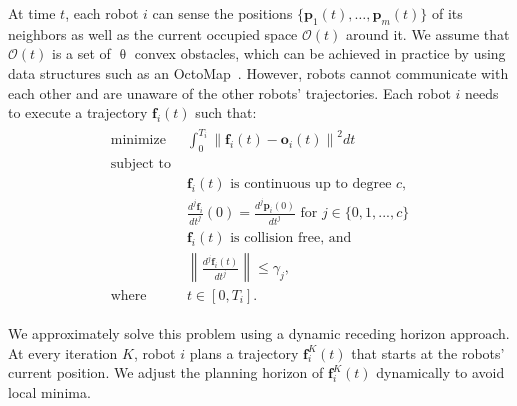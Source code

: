 \documentclass{svproc}
\newcommand{\vp}{\mathbf{p}}
\newcommand{\vf}{\mathbf{f}}
\newcommand{\vo}{\mathbf{o}}
\newcommand{\cO}{\mathcal{O}}
\newcommand{\todo}[1]{\textbf{\textcolor{red}{TODO: #1}}}
\begin{document}
At time $t$, each robot $i$ can sense the positions $\{\vp_1(t),\ldots,\vp_m(t)\}$ of its neighbors as well as the current occupied space $\cO(t)$ around it.
We assume that $\cO(t)$ is a set of $\uptheta$ convex obstacles, which can be achieved in practice by using data structures such as an OctoMap~\cite{octomap}.
However, robots cannot communicate with each other and are unaware of the other robots' trajectories.
Each robot $i$ needs to execute a trajectory $\vf_i(t)$ such that:
\begin{align}
\begin{split}
    \text{minimize } & \int_{0}^{T_i}\left\|\vf_i(t)-\vo_i(t)\right\|^2 dt\\
    \text{subject to }& \\
    &\vf_i(t) \text{ is}\text{ continuous up to degree $c$},\\
    &\frac{d^j\vf_i}{dt^j}(0) = \frac{d^j\vp_i(0)}{dt^j}\text{ for } j\in\{0,1,...,c\}\\
    &\vf_i(t)\text{ is collision free, and}\\ 
    &\left\|\frac{d^j \vf_i(t)}{dt^j}\right\| \leq \gamma_j,\\
    \text{where } & t\in [0,T_i].
\end{split}
\label{eq:problem:opt}
\end{align}

We approximately solve this problem using a dynamic receding horizon approach.
At every iteration $K$, robot $i$ plans a trajectory $\vf^{K}_i(t)$ that starts at the robots' current position.
We adjust the planning horizon of $\vf^{K}_i(t)$ dynamically to avoid local minima.

\end{document}
